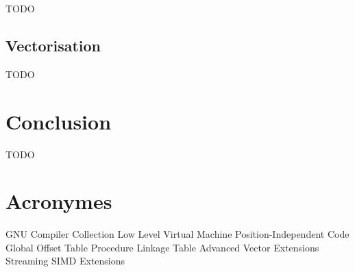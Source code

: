 \documentclass[12pt,a4paper]{article}
\begin{document}
TODO

\subsection{Vectorisation}
\label{sub.optim.vec}

TODO

\section{Conclusion}
\label{sec.conc}

TODO

\newpage
\section*{Acronymes}
\label{sec.acro}

\begin{acronym}
      {GNU Compiler Collection}
     {Low Level Virtual Machine}
      {Position-Independent Code}
      {Global Offset Table}
      {Procedure Linkage Table}
      {Advanced Vector Extensions}
      {Streaming SIMD Extensions}
\end{acronym}
\end{document}
